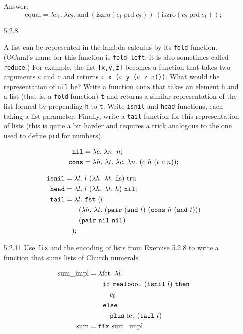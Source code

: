 \documentclass[12pt]{article}
\newcommand{\mt}[1]{\ensuremath{\text{#1}}}
\newcommand{\tru}{\mt{tru}}
\newcommand{\fls}{\mt{fls}}
\newcommand{\abstr}[1]{\lambda #1.\ }
\newcommand{\nil}{\mt{\texttt{nil}}}
\newcommand{\cons}{\mt{\texttt{cons}}}
\newcommand{\isnil}{\mt{\texttt{isnil}}}
\newcommand{\head}{\mt{\texttt{head}}}
\newcommand{\tail}{\mt{\texttt{tail}}}
\newcommand{\fst}{\mt{\texttt{fst}}}
\newcommand{\snd}{\mt{\texttt{snd}}}
\newcommand{\pair}{\mt{\texttt{pair}}}
\newcommand{\plus}{\mt{\texttt{plus}}}
\newcommand{\fix}{\mt{\texttt{fix}}}
\newcommand{\realbool}{\mt{\texttt{realbool}}}
\begin{document}
\begin{enumerate}
Answer:
$$
\mt{equal} = \abstr{c_1}\abstr{c_2} \mt{and} \ (\mt{iszro} (c_1 \ \mt{prd} \ c_2)) \ (\mt{iszro} (c_2 \ \mt{prd} \ c_1));
$$

\newpage
\item[5.2.8]

A list can be represented in the lambda calculus by its \texttt{fold} function. (OCaml's name for this function is \texttt{fold\_left}; it is also sometimes called \texttt{reduce}.) For example, the list \texttt{[x,y,z]} becomes a function that takes two arguments \texttt{c} and \texttt{n} and returns \texttt{c x (c y (c z n)))}. What would the representation of \texttt{nil} be? Write a function \texttt{cons} that takes an element \texttt{h} and a list (that is, a \texttt{fold} function) \texttt{t} and returns a similar representation of the list formed by prepending \texttt{h} to \texttt{t}. Write \texttt{isnil} and \texttt{head} functions, each taking a list parameter. Finally, write a \texttt{tail} function for this representation of lists (this is quite a bit harder and requires a trick analogous to the one used to define \texttt{prd} for numbers).

\begin{align*}
\nil &= \abstr{c} \abstr{n} n; \\
\cons &= \abstr{h} \abstr{t} \abstr{c} \abstr{n} (c \ h \ (t \ c \ n));
\end{align*}

\begin{align*}
\isnil &= \abstr{l} l \ (\abstr{h} \abstr{t} \fls) \ \tru \\
\head &= \abstr{l} l  \ (\abstr{h} \abstr{t} h) \ \nil; \\
\tail &= \abstr{l} \fst \ (l \\
&\qquad (\abstr{h} \abstr{t} (\pair \ (\snd \ t) \ (\cons \ h \ (\snd \ t))) \\
&\qquad (\pair \ \nil \ \nil) \\
&\quad);
\end{align*}


\item[5.2.11] Use \texttt{fix} and the encoding of lists from Exercise 5.2.8 to write a function that sums lists of Church numerals

\begin{align*}
\mt{sum\_impl} &= \abstr{\mt{fct}} \abstr{l} \\ 
&\qquad \texttt{if} \ \realbool \ (\isnil \ l) \ \texttt{then} \\
&\qquad\quad c_0 \\
&\qquad \texttt{else} \\
&\qquad\quad \plus \ \mt{fct} \ (\tail \ l) \\
\mt{sum} &= \fix \ \mt{sum\_impl}
\end{align*}


\end{enumerate}
\end{document}
